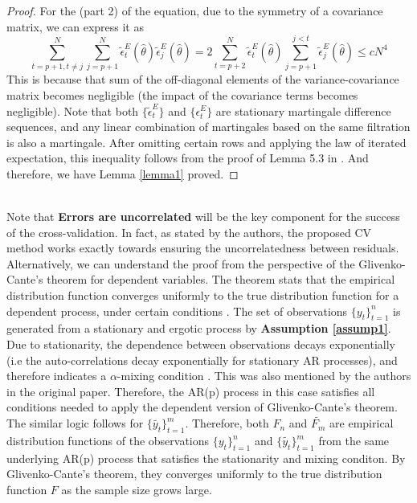 \documentclass[12pt, oneside]{amsart}
\theoremstyle{definition}
\theoremstyle{remark}
\numberwithin{equation}{section}
\begin{document}
\begin{proof}
For the (part 2) of the equation, due to the symmetry of a covariance matrix, we can express it as
$$\sum^N_{t=p+1, t\not = j} \sum^N_{j=p+1} \tilde{\epsilon}^E_t(\hat{\theta}) \tilde{\epsilon}^E_j(\hat{\theta}) = 2 
\sum^N_{t=p+2}\tilde{\epsilon}^E_t(\hat{\theta}) 
\sum^{j < t}_{j=p+1} \tilde{\epsilon}^E_j(\hat{\theta}) \leq cN^4
$$
This is because that sum of the off-diagonal elements of the variance-covariance matrix becomes negligible (the impact of the covariance terms becomes negligible). Note that both $\{ \tilde{\epsilon}^E_t  \}$ and $\{\epsilon^E_t\}$ are stationary martingale difference sequences, and any linear combination of martingales based on the same filtration is also a martingale. After omitting certain rows and applying the law of iterated expectation, this inequality follows from the proof of Lemma 5.3 in \citep{Burman1992}. And therefore, we have Lemma \ref{lemma1} proved. \end{proof}
\\

Note that \textbf{Errors are uncorrelated} will be the key component for the success of the cross-validation. In fact, as stated by the authors, the proposed CV method works exactly towards ensuring the uncorrelatedness between residuals. Alternatively, we can understand the proof from the perspective of the Glivenko-Cante's theorem for dependent variables. The theorem stats that the empirical distribution function converges uniformly to the true distribution function for a dependent process, under certain conditions \citep{Doukhan, Bradley}. The set of observations $\{y_t\}_{t=1}^n$ is generated from a stationary and ergotic process by \textbf{Assumption \ref{assump1}}. Due to stationarity, the dependence between observations decays exponentially (i.e the auto-correlations decay exponentially \citep{Takemura2016} for stationary AR processes),  and therefore indicates a $\alpha$-mixing condition \citep{Brockwell}. This was also mentioned by the authors in the original paper. Therefore, the AR(p) process in this case satisfies all conditions needed to apply the dependent version of Glivenko-Cante's theorem. The similar logic follows for $\{\tilde{y_t}\}_{t=1}^m$. Therefore, both $F_n$ and $\tilde{F_m}$ are empirical distribution functions of the observations $\{y_t\}_{t=1}^n$ and $\{\tilde{y_t}\}_{t=1}^m$ from the same underlying AR(p) process that satisfies the stationarity and mixing conditon. By Glivenko-Cante's theorem, they converges uniformly to the true distribution function $F$ as the sample size grows large. 
\end{document}
